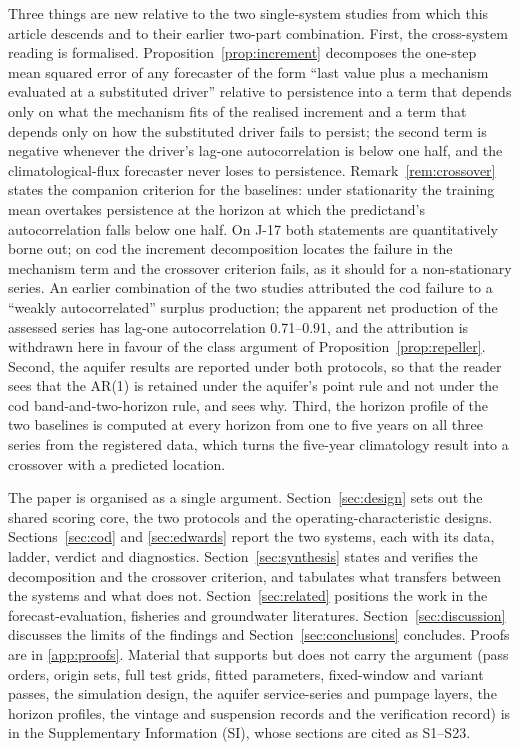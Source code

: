 \documentclass[preprint,11pt,authoryear]{elsarticle}
\theoremstyle{definition}
\theoremstyle{remark}
\begin{document}
Three things are new relative to the two single-system studies from which this article descends and to their earlier two-part combination. First, the cross-system reading is formalised. Proposition~\ref{prop:increment} decomposes the one-step mean squared error of any forecaster of the form ``last value plus a mechanism evaluated at a substituted driver'' relative to persistence into a term that depends only on what the mechanism fits of the realised increment and a term that depends only on how the substituted driver fails to persist; the second term is negative whenever the driver's lag-one autocorrelation is below one half, and the climatological-flux forecaster never loses to persistence. Remark~\ref{rem:crossover} states the companion criterion for the baselines: under stationarity the training mean overtakes persistence at the horizon at which the predictand's autocorrelation falls below one half. On J-17 both statements are quantitatively borne out; on cod the increment decomposition locates the failure in the mechanism term and the crossover criterion fails, as it should for a non-stationary series. An earlier combination of the two studies attributed the cod failure to a ``weakly autocorrelated'' surplus production; the apparent net production of the assessed series has lag-one autocorrelation 0.71--0.91, and the attribution is withdrawn here in favour of the class argument of Proposition~\ref{prop:repeller}. Second, the aquifer results are reported under both protocols, so that the reader sees that the AR(1) is retained under the aquifer's point rule and not under the cod band-and-two-horizon rule, and sees why. Third, the horizon profile of the two baselines is computed at every horizon from one to five years on all three series from the registered data, which turns the five-year climatology result into a crossover with a predicted location.

The paper is organised as a single argument. Section~\ref{sec:design} sets out the shared scoring core, the two protocols and the operating-characteristic designs. Sections~\ref{sec:cod} and \ref{sec:edwards} report the two systems, each with its data, ladder, verdict and diagnostics. Section~\ref{sec:synthesis} states and verifies the decomposition and the crossover criterion, and tabulates what transfers between the systems and what does not. Section~\ref{sec:related} positions the work in the forecast-evaluation, fisheries and groundwater literatures. Section~\ref{sec:discussion} discusses the limits of the findings and Section~\ref{sec:conclusions} concludes. Proofs are in \ref{app:proofs}. Material that supports but does not carry the argument (pass orders, origin sets, full test grids, fitted parameters, fixed-window and variant passes, the simulation design, the aquifer service-series and pumpage layers, the horizon profiles, the vintage and suspension records and the verification record) is in the Supplementary Information (SI), whose sections are cited as S1--S23.
\end{document}
